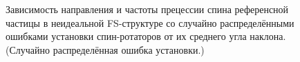 \begin{figure}[!h]
	\centering\hfill
	\hfill
	\hfill
	\caption{Зависимость направления и частоты прецессии спина референсной частицы в неидеальной FS-структуре со случайно распределёнными ошибками установки спин-ротаторов от их среднего угла наклона. (Случайно распределённая ошибка установки.)\label{fig:Linearity_test_shifting_gauss}}
\end{figure}

